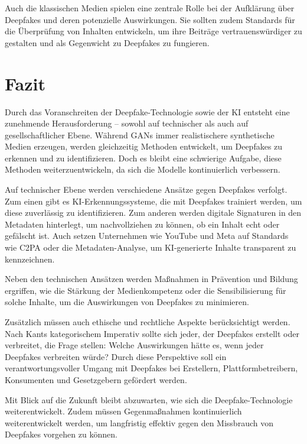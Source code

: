 \documentclass[a4paper,12pt]{article}
\begin{document}
Auch die klassischen Medien spielen eine zentrale Rolle bei der Aufklärung über Deepfakes und deren potenzielle Auswirkungen. Sie sollten zudem Standards für die Überprüfung von Inhalten entwickeln, um ihre Beiträge vertrauenswürdiger zu gestalten und als Gegenwicht zu Deepfakes zu fungieren.\cite{SWP2024}\cite{Fraunhofer2024}

\newpage

\section{Fazit}
Durch das Voranschreiten der Deepfake-Technologie sowie der KI entsteht eine zunehmende Herausforderung – sowohl auf technischer als auch auf gesellschaftlicher Ebene. Während GANs immer realistischere synthetische Medien erzeugen, werden gleichzeitig Methoden entwickelt, um Deepfakes zu erkennen und zu identifizieren. Doch es bleibt eine schwierige Aufgabe, diese Methoden weiterzuentwickeln, da sich die Modelle kontinuierlich verbessern.

Auf technischer Ebene werden verschiedene Ansätze gegen Deepfakes verfolgt. Zum einen gibt es KI-Erkennungssysteme, die mit Deepfakes trainiert werden, um diese zuverlässig zu identifizieren. Zum anderen werden digitale Signaturen in den Metadaten hinterlegt, um nachvollziehen zu können, ob ein Inhalt echt oder gefälscht ist.
Auch setzen Unternehmen wie YouTube und Meta auf Standards wie C2PA oder die Metadaten-Analyse, um KI-generierte Inhalte transparent zu kennzeichnen.

Neben den technischen Ansätzen werden Maßnahmen in Prävention und Bildung ergriffen, wie die Stärkung der Medienkompetenz oder die Sensibilisierung für solche Inhalte, um die Auswirkungen von Deepfakes zu minimieren.

Zusätzlich müssen auch ethische und rechtliche Aspekte berücksichtigt werden. Nach Kants kategorischem Imperativ sollte sich jeder, der Deepfakes erstellt oder verbreitet, die Frage stellen: Welche Auswirkungen hätte es, wenn jeder Deepfakes verbreiten würde? Durch diese Perspektive soll ein verantwortungsvoller Umgang mit Deepfakes bei Erstellern, Plattformbetreibern, Konsumenten und Gesetzgebern gefördert werden.

Mit Blick auf die Zukunft bleibt abzuwarten, wie sich die Deepfake-Technologie weiterentwickelt. Zudem müssen Gegenmaßnahmen kontinuierlich weiterentwickelt werden, um langfristig effektiv gegen den Missbrauch von Deepfakes vorgehen zu können.
\newpage
\end{document}
